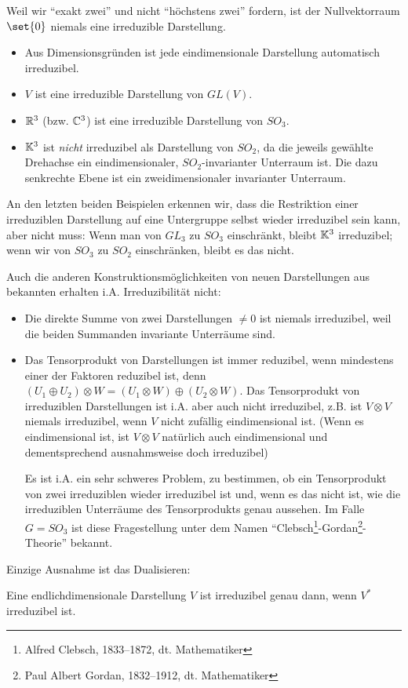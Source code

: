 \begin{remark}
Weil wir \enquote{exakt zwei} und nicht \enquote{höchstens zwei} fordern, ist der Nullvektorraum $\set{0}$ niemals eine irreduzible Darstellung.
\end{remark}

\begin{example}
\begin{itemize}
\item Aus Dimensionsgründen ist jede eindimensionale Darstellung automatisch irreduzibel.
\item $V$ ist eine irreduzible Darstellung von $GL(V)$.
\item $\mathbb{R}^3$ (bzw. $\mathbb{C}^3$) ist eine irreduzible Darstellung von $SO_3$.
\item $\mathbb{K}^3$ ist \emph{nicht} irreduzibel als Darstellung von $SO_2$, da die jeweils gewählte Drehachse ein eindimensionaler, $SO_2$-invarianter Unterraum ist. Die dazu senkrechte Ebene ist ein zweidimensionaler invarianter Unterraum.
\end{itemize}
\end{example}

\begin{remark}
An den letzten beiden Beispielen erkennen wir, dass die Restriktion einer irreduziblen Darstellung auf eine Untergruppe selbst wieder irreduzibel sein kann, aber nicht muss: Wenn man von $GL_3$ zu $SO_3$ einschränkt, bleibt $\mathbb{K}^3$ irreduzibel; wenn wir von $SO_3$ zu $SO_2$ einschränken, bleibt es das nicht.

Auch die anderen Konstruktionsmöglichkeiten von neuen Darstellungen aus bekannten erhalten i.A. Irreduzibilität nicht:
\begin{itemize}
\item Die direkte Summe von zwei Darstellungen $\neq 0$ ist niemals irreduzibel, weil die beiden Summanden invariante Unterräume sind.
\item Das Tensorprodukt von Darstellungen ist immer reduzibel, wenn mindestens einer der Faktoren reduzibel ist, denn $(U_1\oplus U_2)\otimes W = (U_1\otimes W) \oplus (U_2\otimes W)$. Das Tensorprodukt von irreduziblen Darstellungen ist i.A. aber auch nicht irreduzibel, z.B. ist $V\otimes V$ niemals irreduzibel, wenn $V$ nicht zufällig eindimensional ist. (Wenn es eindimensional ist, ist $V\otimes V$ natürlich auch eindimensional und dementsprechend ausnahmsweise doch irreduzibel)

Es ist i.A. ein sehr schweres Problem, zu bestimmen, ob ein Tensorprodukt von zwei irreduziblen wieder irreduzibel ist und, wenn es das nicht ist, wie die irreduziblen Unterräume des Tensorprodukts genau aussehen. Im Falle $G=SO_3$ ist diese Fragestellung unter dem Namen \enquote{Clebsch\footnote{Alfred Clebsch, 1833--1872, dt. Mathematiker}-Gordan\footnote{Paul Albert Gordan, 1832--1912, dt. Mathematiker}-Theorie} bekannt.
\end{itemize}

Einzige Ausnahme ist das Dualisieren:
\end{remark}

\begin{lemma}
Eine endlichdimensionale Darstellung $V$ ist irreduzibel genau dann, wenn $V^\ast$ irreduzibel ist.
\end{lemma}